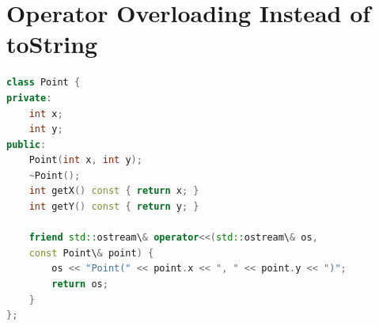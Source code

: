 \documentclass{report}
\begin{document}
\section*{Operator Overloading Instead of toString}

\begin{lstlisting}[language=C++]
class Point {
private:
	int x;
	int y;
public:
	Point(int x, int y);
	~Point();
	int getX() const { return x; }
	int getY() const { return y; }
	
	friend std::ostream\& operator<<(std::ostream\& os, 
	const Point\& point) {
		os << "Point(" << point.x << ", " << point.y << ")";
		return os;
	}
};
	\end{lstlisting}


\end{document}
